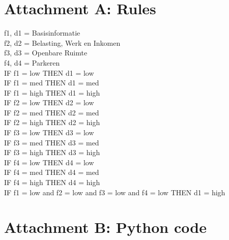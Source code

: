\documentclass[journal]{IEEEtran}
\begin{document}
\section*{Attachment A: Rules}
\label{sec:rules}
\noindent
f1, d1 = Basisinformatie\\
f2, d2 = Belasting, Werk en Inkomen\\
f3, d3 = Openbare Ruimte\\
f4, d4 = Parkeren\\

\noindent
IF f1 = low THEN d1 = low\\
IF f1 = med THEN d1 = med\\
IF f1 = high THEN d1 = high\\
IF f2 = low THEN d2 = low\\
IF f2 = med THEN d2 = med\\
IF f2 = high THEN d2 = high\\
IF f3 = low THEN d3 = low\\
IF f3 = med THEN d3 = med\\
IF f3 = high THEN d3 = high\\
IF f4 = low THEN d4 = low\\
IF f4 = med THEN d4 = med\\
IF f4 = high THEN d4 = high\\
IF f1 = low and f2 = low and f3 = low and f4 = low THEN d1 = high

\newpage

\section*{Attachment B: Python code}
\label{sec:python}
\end{document}
